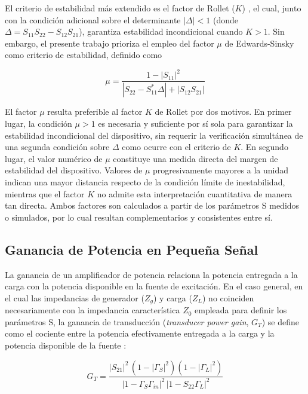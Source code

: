 El criterio de estabilidad más extendido es el factor de Rollet ($K$) \cite{rollet1962}, el cual, junto con la condición adicional sobre el determinante $|\Delta| < 1$ (donde $\Delta = S_{11}S_{22} - S_{12}S_{21}$), garantiza estabilidad incondicional cuando $K > 1$. Sin embargo, el presente trabajo prioriza el empleo del factor $\mu$ de Edwards-Sinsky como criterio de estabilidad, definido como \cite{edwards1992}

\begin{equation}
    \mu = \frac{1 - |S_{11}|^2}{|S_{22} - S_{11}^{*}\Delta| + |S_{12}S_{21}|}
    \label{eq:mu_factor}
\end{equation}

El factor $\mu$ resulta preferible al factor $K$ de Rollet por dos motivos. En primer lugar, la condición $\mu > 1$ es necesaria y suficiente por sí sola para garantizar la estabilidad incondicional del dispositivo, sin requerir la verificación simultánea de una segunda condición sobre $\Delta$ como ocurre con el criterio de $K$. En segundo lugar, el valor numérico de $\mu$ constituye una medida directa del margen de estabilidad del dispositivo. Valores de $\mu$ progresivamente mayores a la unidad indican una mayor distancia respecto de la condición límite de inestabilidad, mientras que el factor $K$ no admite esta interpretación cuantitativa de manera tan directa. Ambos factores son calculados a partir de los parámetros S medidos o simulados, por lo cual resultan complementarios y consistentes entre sí.

\subsection{Ganancia de Potencia en Pequeña Señal}
La ganancia de un amplificador de potencia relaciona la potencia entregada a la carga con la potencia disponible en la fuente de excitación. En el caso general, en el cual las impedancias de generador ($Z_g$) y carga ($Z_L$) no coinciden necesariamente con la impedancia característica $Z_0$ empleada para definir los parámetros S, la ganancia de transducción (\textit{transducer power gain}, $G_T$) se define como el cociente entre la potencia efectivamente entregada a la carga y la potencia disponible de la fuente \cite[p.~561]{pozar2011}:

\begin{equation}
    G_T = \frac{|S_{21}|^2\,(1-|\Gamma_S|^2)(1-|\Gamma_L|^2)}{|1-\Gamma_S\Gamma_{in}|^2\,|1-S_{22}\Gamma_L|^2}
    \label{eq:ganancia_transductora}
\end{equation}

